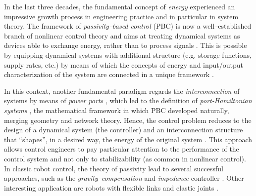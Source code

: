 %
In the last three decades, the fundamental concept of \textit{energy} experienced an impressive growth process in engineering practice and in particular in system theory. 
%
%
%
The framework of \textit{passivity--based control} (PBC) is now a well--established branch of nonlinear control theory and aims at treating dynamical systems as devices able to exchange energy, rather than to process signals \cite{ortega2001putting}. 
This is possible by equipping dynamical systems with additional structure (e.g. storage functions, supply rates, etc.) by means of which the concepts of energy and input/output characterization of the system are connected in a unique framework \cite{sontag2008input}.
%
\newline

%
In this context, another fundamental paradigm regards the \textit{interconnection} of systems by means of \textit{power ports} \cite{duindam2009modeling}, which led to the definition of \textit{port-Hamiltonian systems} \cite{ortega2001putting,van2014port,MASCHKE1992359}, the mathematical framework in which PBC developed naturally, merging geometry and network theory. Hence, the control problem reduces to the design of a dynamical system (the controller) and an interconnection structure that ``shapes'', in a desired way, the energy of the original system \cite{ortega2001putting,ortega2008control}.
%
%
%
This approach allows control engineers to pay particular attention to the performance of the control system and not only to stabilizability (as common in nonlinear control).
%
%
%
In classic robot control, the theory of passivity lead to several successful approaches, such as the \textit{gravity--compensation} \cite{arimoto1984stability} and \textit{impedance} controller \cite{secchi2007control}. Other interesting application are robots with flexible links \cite{macchelli2009} and elastic joints \cite{zhang2016}.
%
